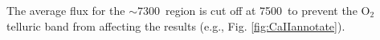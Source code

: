 The average flux for the $\sim 7300$~\AAA region is cut off at 7500~\AAA to prevent the O$_2$ telluric band from affecting the results (e.g., Fig. \ref{fig:CaIIannotate}).